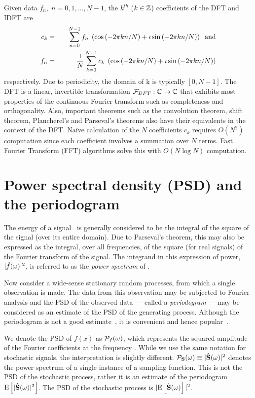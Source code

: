 Given data $f_n, \; n=0,1,...,N-1$, the $k^{th}$ ($k\in\mathbb{Z}$) coefficients of the DFT and IDFT are 
\begin{eqnarray}
 \label{eq:DFT}c_k &=& \quad \sum\limits_{n=0}^{N-1} f_n \; \left( \cos{(-2\pi k n/N)} + \mathrm{\imath} \sin{(-2\pi k n/N)} \right) \;\; \mathrm{and}\\
 \label{eq:IDFT} f_n &=& \frac 1 N \sum\limits_{k=0}^{N-1} c_k \; \left( \cos{(-2\pi k n/N)} + \mathrm{\imath} \sin{(-2\pi k n/N)} \right)
\end{eqnarray}
respectively. Due to periodicity, the domain of k is typically $[0,N-1]$. The DFT is a linear, invertible transformation $\mathcal{F}_{DFT}: \mathbb{C} \rightarrow \mathbb{C}$ that exhibits most properties of the continuous Fourier transform such as completeness and orthogonality. Also, important theorems such as the convolution theorem, shift theorem, Plancherel's and Parseval's theorems also have their equivalents in the context of the DFT. Na\"ive calculation of the $N$ coefficients $c_k$ requires $O(N^2)$ computation since each coefficient involves a summation over $N$ terms. Fast Fourier Transform (FFT) algorithms solve this with $O(N \log{N})$ computation.

\section{Power spectral density (PSD) and the periodogram}
The energy of a signal \ifn\ is generally considered to be the integral of the square of the signal (over its entire domain). Due to Parseval's theorem, this may also be expressed as the integral, over all frequencies, of the square (for real signals) of the Fourier transform of the signal. The integrand in this expression of power, $|\hat{f}(\omega)|^2$, is referred to as the \textit{power spectrum} of \ifn. 

Now consider a wide-sense stationary random processes, from which a single observation is made. The data from this observation may be subjected to Fourier analysis and the PSD of the observed data --- called a \textit{periodogram} --- may be considered as an estimate of the PSD of the generating process. Although the periodogram is not a good estimate~\cite[Sec.14.2.2]{DimitrisIngle}, it is convenient and hence popular~\cite{journals/cgf/LagaeD08}. 

We denote the PSD of $f(x)$ as $\mathcal{P}_{f}(\omega)$, which represents the squared amplitude of the Fourier coefficients at the frequency \fv. While we use the same notation for stochastic signals, the interpretation is slightly different. $\mathcal{P}_{\mathbf{S}}(\omega) \equiv |\hat{\mathbf{S}}(\omega)|^2$ denotes the power spectrum of a single instance of a sampling function. This is not the PSD of the stochastic process, rather it is an estimate of the periodogram $\mathrm{E} \left[|\hat{\mathbf{S}}(\omega)|^2 \right]$. The PSD of the stochastic process is $|\mathrm{E} \left[\hat{\mathbf{S}}(\omega) \right]|^2$.


